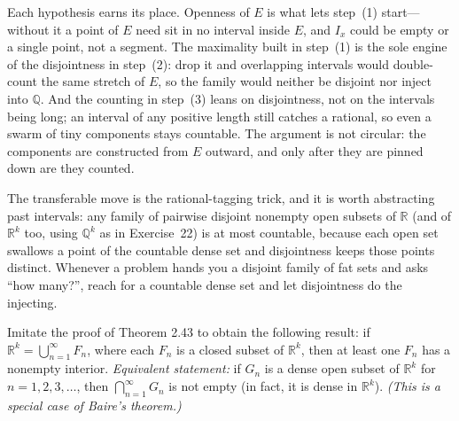 \documentclass[main.tex]{subfiles}
\begin{document}
\begin{Reflection}
Each hypothesis earns its place. Openness of $E$ is what lets step~(1) start---without it a point of $E$
need sit in no interval inside $E$, and $I_x$ could be empty or a single point, not a segment. The
maximality built in step~(1) is the sole engine of the disjointness in step~(2): drop it and overlapping
intervals would double-count the same stretch of $E$, so the family would neither be disjoint nor inject
into $\mathbb Q$. And the counting in step~(3) leans on disjointness, not on the intervals being long; an
interval of any positive length still catches a rational, so even a swarm of tiny components stays
countable. The argument is not circular: the components are constructed from $E$ outward, and only after
they are pinned down are they counted.

The transferable move is the rational-tagging trick, and it is worth abstracting past intervals: any
family of pairwise disjoint nonempty open subsets of $\mathbb R$ (and of $\mathbb R^k$ too, using
$\mathbb Q^k$ as in Exercise~22) is at most countable, because each open set swallows a point of the
countable dense set and disjointness keeps those points distinct. Whenever a problem hands you a disjoint
family of fat sets and asks ``how many?'', reach for a countable dense set and let disjointness do the
injecting.
\end{Reflection}

Imitate the proof of Theorem 2.43 to obtain the following result: if $\mathbb R^{k}=\bigcup_{n=1}^{\infty}F_{n}$, where each $F_{n}$ is a closed subset of $\mathbb R^{k}$, then at least one $F_{n}$ has a nonempty interior. \emph{Equivalent statement:} if $G_{n}$ is a dense open subset of $\mathbb R^{k}$ for $n=1,2,3,\ldots$, then $\bigcap_{n=1}^{\infty}G_{n}$ is not empty (in fact, it is dense in $\mathbb R^{k}$). \emph{(This is a special case of Baire's theorem.)}
\end{document}
